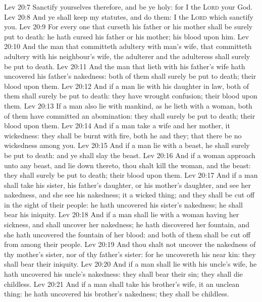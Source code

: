 \vs Lev 20:7 Sanctify yourselves therefore, and be ye holy: for I  the \textsc{Lord} your God.
\vs Lev 20:8 And ye shall keep my statutes, and do them: I  the \textsc{Lord} which sanctify you.
\vs Lev 20:9 For every one that curseth his father or his mother shall be surely put to death: he hath cursed his father or his mother; his blood  upon him.
\vs Lev 20:10 And the man that committeth adultery with  man's wife,  that committeth adultery with his neighbour's wife, the adulterer and the adulteress shall surely be put to death.
\vs Lev 20:11 And the man that lieth with his father's wife hath uncovered his father's nakedness: both of them shall surely be put to death; their blood  upon them.
\vs Lev 20:12 And if a man lie with his daughter in law, both of them shall surely be put to death: they have wrought confusion; their blood  upon them.
\vs Lev 20:13 If a man also lie with mankind, as he lieth with a woman, both of them have committed an abomination: they shall surely be put to death; their blood  upon them.
\vs Lev 20:14 And if a man take a wife and her mother, it  wickedness: they shall be burnt with fire, both he and they; that there be no wickedness among you.
\vs Lev 20:15 And if a man lie with a beast, he shall surely be put to death: and ye shall slay the beast.
\vs Lev 20:16 And if a woman approach unto any beast, and lie down thereto, thou shalt kill the woman, and the beast: they shall surely be put to death; their blood  upon them.
\vs Lev 20:17 And if a man shall take his sister, his father's daughter, or his mother's daughter, and see her nakedness, and she see his nakedness; it  a wicked thing; and they shall be cut off in the sight of their people: he hath uncovered his sister's nakedness; he shall bear his iniquity.
\vs Lev 20:18 And if a man shall lie with a woman having her sickness, and shall uncover her nakedness; he hath discovered her fountain, and she hath uncovered the fountain of her blood: and both of them shall be cut off from among their people.
\vs Lev 20:19 And thou shalt not uncover the nakedness of thy mother's sister, nor of thy father's sister: for he uncovereth his near kin: they shall bear their iniquity.
\vs Lev 20:20 And if a man shall lie with his uncle's wife, he hath uncovered his uncle's nakedness: they shall bear their sin; they shall die childless.
\vs Lev 20:21 And if a man shall take his brother's wife, it  an unclean thing: he hath uncovered his brother's nakedness; they shall be childless.
